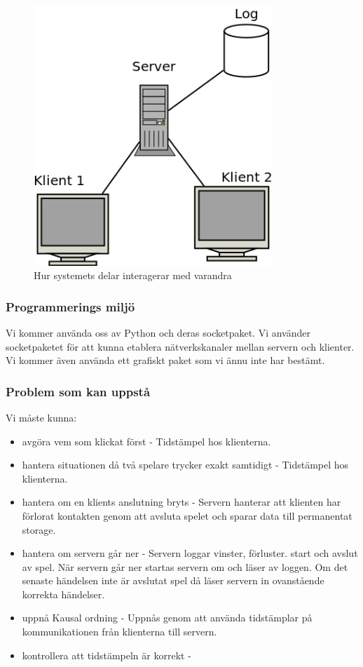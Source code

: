 \documentclass[a4paper]{article}
\begin{document}
\begin{figure}[H]
\includegraphics[width=0.8\textwidth]{design.png}
\caption{Hur systemets delar interagerar med varandra}
\end{figure}

\subsubsection{Programmerings miljö}
Vi kommer använda oss av Python och deras socketpaket. Vi använder socketpaketet för att kunna etablera nätverkskanaler mellan servern och klienter. Vi kommer även använda ett grafiskt paket som vi ännu inte har bestämt.
\subsubsection{Problem som kan uppstå}
Vi måste kunna:
\begin{itemize}
\item avgöra vem som klickat först - Tidstämpel hos klienterna.
\item hantera situationen då två spelare trycker exakt samtidigt -  Tidstämpel hos klienterna.
\item hantera om en klients anslutning bryts - Servern hanterar att klienten har förlorat kontakten genom att avsluta spelet och sparar data till permanentat storage.
\item hantera om servern går ner - Servern loggar vinster, förluster. start och avslut av spel. När servern går ner startas servern om och läser av loggen. Om det senaste händelsen inte är avslutat spel då läser servern in ovanstående korrekta händelser.
\item uppnå Kausal ordning - Uppnås genom att använda tidstämplar på kommunikationen från klienterna till servern.
\item kontrollera att tidstämpeln är korrekt -
\end{itemize}
\end{document}

